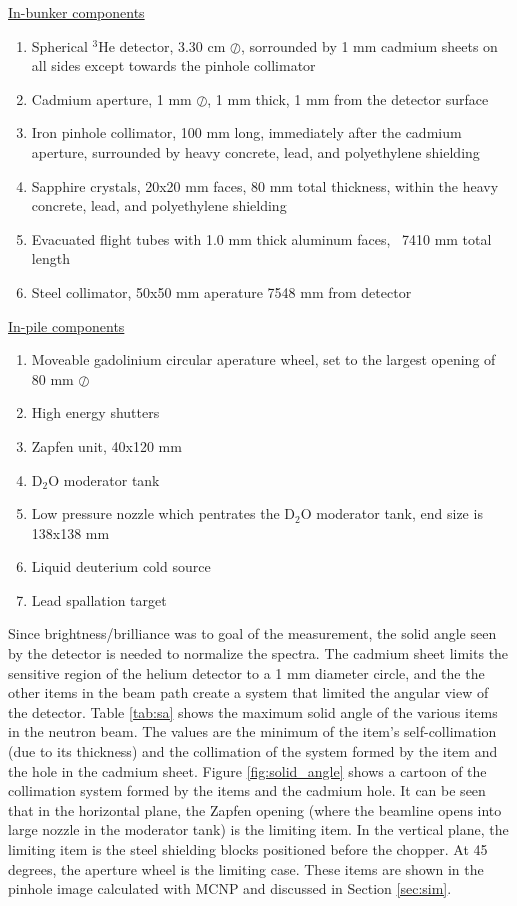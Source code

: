\documentclass[preprint,12pt]{elsarticle}
\begin{document}
\begin{center} \underline{In-bunker components}\end{center}
\begin{enumerate}
  \item Spherical $^3$He detector, 3.30 cm $\oslash$, sorrounded by 1 mm cadmium sheets on all sides except towards the pinhole collimator
  \item Cadmium aperture, 1 mm $\oslash$, 1 mm thick, 1 mm from the detector surface
  \item Iron pinhole collimator, 100 mm long, immediately after the cadmium aperture, surrounded by heavy concrete, lead, and polyethylene shielding
  \item Sapphire crystals, 20x20 mm faces, 80 mm total thickness, within the heavy concrete, lead, and polyethylene shielding
  \item Evacuated flight tubes with 1.0 mm thick aluminum faces, ~7410 mm total length 
  \item Steel collimator, 50x50 mm aperature 7548 mm from detector
\end{enumerate}
\begin{center}\underline{In-pile components}\end{center}
\begin{enumerate}[resume]
  \item Moveable gadolinium circular aperature wheel, set to the largest opening of 80 mm $\oslash$
  \item High energy shutters
  \item Zapfen unit, 40x120 mm
  \item D$_2$O moderator tank
  \item Low pressure nozzle which pentrates the D$_2$O moderator tank, end size is 138x138 mm
  \item Liquid deuterium cold source
  \item Lead spallation target
\end{enumerate}


Since brightness/brilliance was to goal of the measurement, the solid angle seen by the detector is needed to normalize the spectra.  The cadmium sheet limits the sensitive region of the helium detector to a 1 mm diameter circle, and the the other items in the beam path create a system that limited the angular view of the detector.  Table \ref{tab:sa} shows the maximum solid angle of the various items in the neutron beam.  The values are the minimum of the item's self-collimation (due to its thickness) and the collimation of the system formed by the item and the hole in the cadmium sheet.  Figure \ref{fig:solid_angle} shows a cartoon of the collimation system formed by the items and the cadmium hole.  It can be seen that in the horizontal plane, the Zapfen opening (where the beamline opens into large nozzle in the moderator tank) is the limiting item.  In the vertical plane, the limiting item is the steel shielding blocks positioned before the chopper.  At 45 degrees, the aperture wheel is the limiting case.  These items are shown in the pinhole image calculated with MCNP and discussed in Section \ref{sec:sim}.
\end{document}
